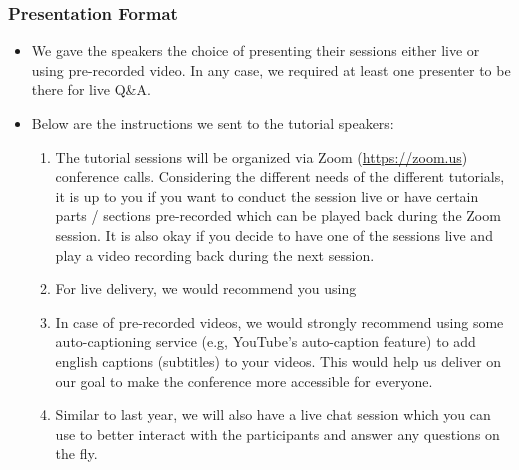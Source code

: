 \documentclass[%
10pt,								%
]
{scrartcl}
\begin{document}
        \subsubsection{Presentation Format}
            \begin{itemize}
                \item We gave the speakers the choice of presenting their sessions either live or using pre-recorded video.  In any case, we required at least one presenter to be there for live Q\&A.


                \item   Below are the instructions we sent to the tutorial speakers:
                    \begin{enumerate}
                        \item The tutorial sessions will be organized via Zoom (\href{https://zoom.us}{https://zoom.us}) conference calls. Considering the different needs of the different tutorials, it is up to you if you want to conduct the session live or have certain parts / sections pre-recorded which can be played back during the Zoom session. It is also okay if you decide to have one of the sessions live and play a video recording back during the next session.                  
                        \item   For live delivery, we would recommend you using 
                        \item   In case of pre-recorded videos, we would strongly recommend using some auto-captioning service (e.g, YouTube's auto-caption feature) to add english captions (subtitles) to your videos. This would help us deliver on our goal to make the conference more accessible for everyone.
                        \item   Similar to last year, we will also have a live chat session which you can use to better interact with the participants and answer any questions on the fly.
                    \end{enumerate}
            \end{itemize}
          
\end{document}
